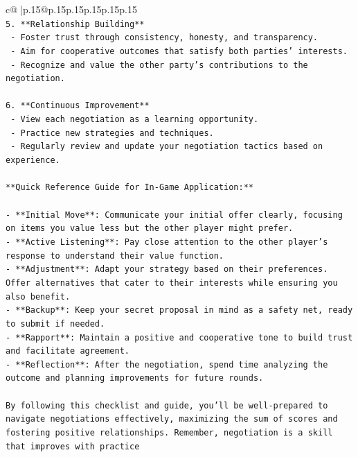 \documentclass{article}
\begin{document}
{\begin{supertabular}{c@{$\;$}|p{.15\linewidth}@{}p{.15\linewidth}p{.15\linewidth}p{.15\linewidth}p{.15\linewidth}p{.15\linewidth}}
{{{\\ 
\texttt{5. **Relationship Building**} \\
\texttt{   {-} Foster trust through consistency, honesty, and transparency.} \\
\texttt{   {-} Aim for cooperative outcomes that satisfy both parties' interests.} \\
\texttt{   {-} Recognize and value the other party's contributions to the negotiation.} \\
\\ 
\texttt{6. **Continuous Improvement**} \\
\texttt{   {-} View each negotiation as a learning opportunity.} \\
\texttt{   {-} Practice new strategies and techniques.} \\
\texttt{   {-} Regularly review and update your negotiation tactics based on experience.} \\
\\ 
\texttt{**Quick Reference Guide for In{-}Game Application:**} \\
\\ 
\texttt{{-} **Initial Move**: Communicate your initial offer clearly, focusing on items you value less but the other player might prefer.} \\
\texttt{{-} **Active Listening**: Pay close attention to the other player's response to understand their value function.} \\
\texttt{{-} **Adjustment**: Adapt your strategy based on their preferences. Offer alternatives that cater to their interests while ensuring you also benefit.} \\
\texttt{{-} **Backup**: Keep your secret proposal in mind as a safety net, ready to submit if needed.} \\
\texttt{{-} **Rapport**: Maintain a positive and cooperative tone to build trust and facilitate agreement.} \\
\texttt{{-} **Reflection**: After the negotiation, spend time analyzing the outcome and planning improvements for future rounds.} \\
\\ 
\texttt{By following this checklist and guide, you'll be well{-}prepared to navigate negotiations effectively, maximizing the sum of scores and fostering positive relationships. Remember, negotiation is a skill that improves with practice} \\
            }
        }
    }
     \\ \\


\end{supertabular}}
\end{document}

